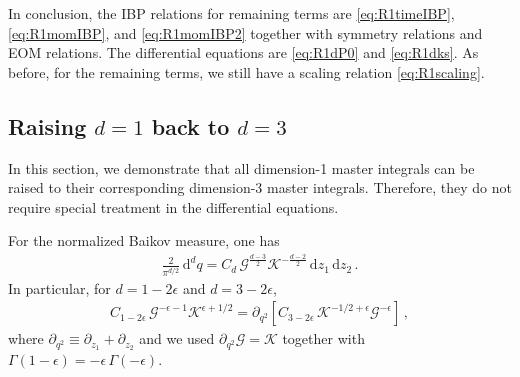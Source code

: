 \documentclass[%
 reprint,
 amsmath,amssymb,
 aps,
prd,
]{revtex4-2}
\newcommand{\n}{\nonumber}
\def\di{{\mathrm{d}}}
\def\ep{\epsilon}
\newcommand{\mG}{\mathcal{G}}
\newcommand{\mK}{\mathcal{K}}
\begin{document}
\begin{widetext}
In conclusion, the IBP relations for remaining terms are \eqref{eq:R1timeIBP}, \eqref{eq:R1momIBP}, and \eqref{eq:R1momIBP2} together with symmetry relations and EOM relations. The differential equations are \eqref{eq:R1dP0} and \eqref{eq:R1dks}. As before, for the remaining terms, we still have a scaling relation \eqref{eq:R1scaling}.

\subsection{Raising $d=1$ back to $d=3$}
In this section, we demonstrate that all dimension-1 master integrals can be raised to their corresponding dimension-3 master integrals. Therefore, they do not require special treatment in the differential equations. 

For the normalized Baikov measure, one has
\begin{align}
	\frac{2}{\pi^{d/2}}\,\di^d q = C_d\,\mG^{\frac{d-3}{2}}\mK^{-\frac{d-2}{2}}\,\di z_1\,\di z_2\,.
\end{align}
In particular, for $d=1-2\ep$ and $d=3-2\ep$,
\begin{align}\label{shift}
	C_{1-2\ep}\,\mG^{-\ep-1}\mK^{\ep+1/2}
	= \partial_{q^2}\!\left[C_{3-2\ep}\,\mK^{-1/2+\ep}\mG^{-\ep}\right]\,,
\end{align}
where $\partial_{q^2}\equiv\partial_{z_1}+\partial_{z_2}$ and we used $\partial_{q^2}\mG=\mK$ together with $\Gamma(1-\ep)=-\ep\,\Gamma(-\ep)$.


\end{widetext}
\end{document}
